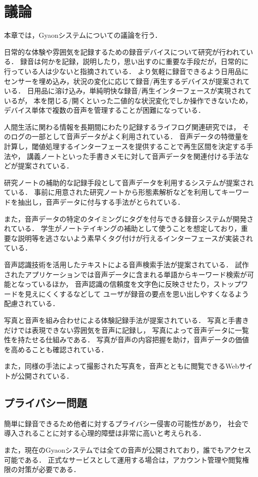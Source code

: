 \chapter{議論}
\label{chap:discussion}

本章では，Gyaonシステムについての議論を行う．

\newpage

日常的な体験や雰囲気を記録するための録音デバイスについて研究が行われている\cite{Poupyrev}．
録音は何かを記録，説明したり，思い出すのに重要な手段だが，日常的に行っている人は少ないと指摘されている．
より気軽に録音できるよう日用品にセンサーを埋め込み，状況の変化に応じて録音/再生するデバイスが提案されている．
日用品に溶け込み，単純明快な録音/再生インターフェースが実現されているが，
本を閉じる/開くといった二値的な状況変化でしか操作できないため，
デバイス単体で複数の音声を管理することが困難になっている．

人間生活に関わる情報を長期間にわたり記録するライフログ関連研究では，
そのログの一部として音声データがよく利用されている\cite{Bell}．
音声データの特徴量を計算し，閾値処理するインターフェースを提供することで再生区間を決定する手法\cite{Kawamura}や，
講義ノートといった手書きメモに対して音声データを関連付ける手法\cite{Stifelman}などが提案されている．

研究ノートの補助的な記録手段として音声データを利用するシステムが提案されている\cite{Kawanishi}．
事前に用意された研究ノートから形態素解析などを利用してキーワードを抽出し，音声データに付与する手法がとられている．

また，音声データの特定のタイミングにタグを付与できる録音システムが開発されている\cite{Fujisaka}．
学生がノートテイキングの補助として使うことを想定しており，重要な説明等を逃さないよう素早くタグ付けが行えるインターフェースが実装されている．

音声認識技術を活用したテキストによる音声検索手法が提案されている\cite{Vemuri}．
試作されたアプリケーションでは音声データに含まれる単語からキーワード検索が可能となっているほか，
音声認識の信頼度を文字色に反映させたり，ストップワードを見えにくくするなどして
ユーザが録音の要点を思い出しやすくなるよう配慮されている．

写真と音声を組み合わせによる体験記録手法が提案されている\cite{Nakakura}．
写真と手書きだけでは表現できない雰囲気を音声に記録し，
写真によって音声データに一覧性を持たせる仕組みである．
写真が音声の内容把握を助け，音声データの価値を高めることも確認されている．

また，同様の手法によって撮影された写真を，音声とともに閲覧できるWebサイトが公開されている\cite{Masui}．

\section{プライバシー問題}
簡単に録音できるため他者に対するプライバシー侵害の可能性があり，
社会で導入されることに対する心理的障壁は非常に高いと考えられる\cite{Kawamura}．

また，現在のGyaonシステムでは全ての音声が公開されており，誰でもアクセス可能である．
正式なサービスとして運用する場合は，アカウント管理や閲覧権限の対策が必要である．